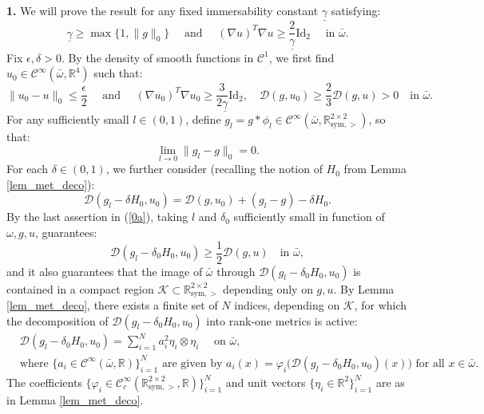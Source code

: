\documentclass[reqno,twoside,11pt]{amsart}
\newcommand{\sym}{\mathrm{sym}}
\newcommand{\Id}{\mathrm{Id}}
\newcommand{\R}{\mathbb{R}}
\numberwithin{equation}{section}
\theoremstyle{plain}
\theoremstyle{definition}
\begin{document}
{\bf 1.} We will prove the result for any fixed immersability constant $\underline\gamma$ satisfying:
$$\underline\gamma\geq
\max\{1,\|g\|_0\}\quad\mbox{ and }\quad (\nabla u)^T\nabla u\geq
\frac{2}{\underline\gamma}\Id_2\quad \mbox{ in } \bar\omega.$$
Fix $\epsilon, \delta>0$. By the density of smooth functions in
$\mathcal{C}^1$, we first find $u_0\in\mathcal{C}^\infty(\bar\omega,\R^4)$ such that:
\begin{equation}\label{0a}
\|u_0-u\|_0\leq \frac{\epsilon}{2} \quad \mbox{ and } \quad (\nabla
u_0)^T\nabla u_0\geq \frac{3}{2\underline\gamma}\Id_2,\quad
\mathcal{D}(g,u_0)\geq\frac{2}{3}\mathcal{D}(g,u)>0 \quad\mbox{in } \bar\omega. 
\end{equation}
For any sufficiently small $l\in (0,1)$, define $g_l = g\ast
\phi_l\in\mathcal{C}^\infty(\bar\omega, \R^{2\times 2}_{\sym, >})$, so that:
\begin{equation}\label{0b}
\lim_{l\to 0}\|g_l-g\|_0=0.
\end{equation}
For each $\delta\in (0, 1)$, we further consider (recalling the notion
of $H_0$ from Lemma \ref{lem_met_deco}):
$$\mathcal{D}(g_l-\delta H_0, u_0) = \mathcal{D}(g,u_0) + (g_l-g) -\delta H_0.$$
By the last assertion in (\ref{0a}), taking $l$ and $\delta_0$
sufficiently small in function of $\omega, g, u$, guarantees:
\begin{equation}\label{b3}
\mathcal{D}(g_l - \delta_0 H_0, u_0)\geq
  \frac{1}{2}\mathcal{D}(g, u)\quad\mbox{in } \bar\omega,
\end{equation}
and it also guarantees that the image of $\bar\omega$ through $\mathcal{D}(g_l - \delta_0
H_0, u_0)$ is contained in a compact region
$\mathcal{K}\subset\R^{2\times 2}_{\sym,>}$ depending only on $g, u$.
By Lemma \ref{lem_met_deco}, there exists a finite set of $N$
indices, depending on $\mathcal{K}$, for which the decomposition
of $\mathcal{D}(g_l - \delta_0H_0, u_0)$ into rank-one metrics is active:
\begin{equation*}
\begin{split}
& \mathcal{D}(g_l - \delta_0 H_0, u_0) = \sum_{i=1}^N
a_i^2\eta_i\otimes\eta_i \quad\mbox{ on } \bar\omega,\\
& \mbox{where } \{a_i\in\mathcal{C}^\infty(\bar\omega,\R)\}_{i=1}^N
\mbox{ are given by } a_i(x) = \varphi_i\Big(\mathcal{D}(g_l-\delta_0
H_0, u_0)(x)\Big) \mbox{ for all } x\in\bar\omega.
\end{split}
\end{equation*}
The coefficients $\{\varphi_i\in\mathcal{C}^\infty_c(\R^{2\times
  2}_{\sym,>}, \R)\}_{i=1}^N$ and unit  vectors
$\{\eta_i\in\R^2\}_{i=1}^N$ are as in Lemma \ref{lem_met_deco}.
\end{document}
